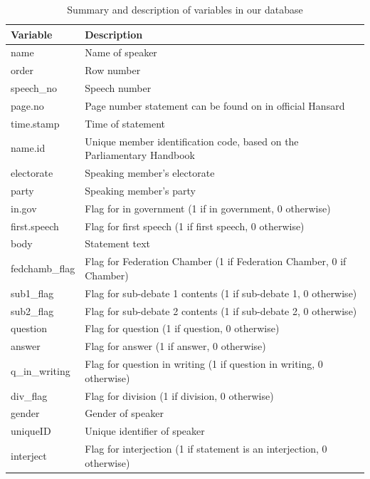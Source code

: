 \documentclass[
  letterpaper,
  DIV=11,
  numbers=noendperiod]{scrartcl}
\begin{document}
\hypertarget{tbl-vars}{}
\begin{table}[H]
\caption{\label{tbl-vars}Summary and description of variables in our database }\tabularnewline

\centering
\begin{tabular}{ll}
\toprule
Variable & Description\\
\midrule
name & Name of speaker\\
order & Row number\\
speech\_no & Speech number\\
page.no & Page number statement can be found on in official Hansard\\
time.stamp & Time of statement\\
\addlinespace
name.id & Unique member identification code, based on the Parliamentary Handbook\\
electorate & Speaking member's electorate\\
party & Speaking member's party\\
in.gov & Flag for in government (1 if in government, 0 otherwise)\\
first.speech & Flag for first speech (1 if first speech, 0 otherwise)\\
\addlinespace
body & Statement text\\
fedchamb\_flag & Flag for Federation Chamber (1 if Federation Chamber, 0 if Chamber)\\
sub1\_flag & Flag for sub-debate 1 contents (1 if sub-debate 1, 0 otherwise)\\
sub2\_flag & Flag for sub-debate 2 contents (1 if sub-debate 2, 0 otherwise)\\
question & Flag for question (1 if question, 0 otherwise)\\
\addlinespace
answer & Flag for answer (1 if answer, 0 otherwise)\\
q\_in\_writing & Flag for question in writing (1 if question in writing, 0 otherwise)\\
div\_flag & Flag for division (1 if division, 0 otherwise)\\
gender & Gender of speaker\\
uniqueID & Unique identifier of speaker\\
\addlinespace
interject & Flag for interjection (1 if statement is an interjection, 0 otherwise)\\
\bottomrule
\end{tabular}
\end{table}
\end{document}

